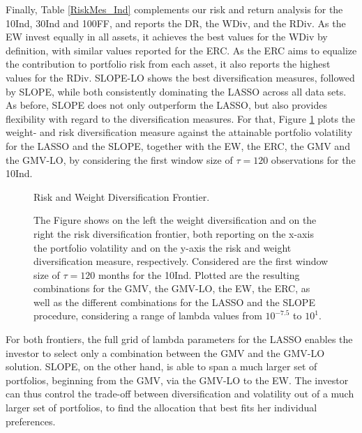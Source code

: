 \documentclass[12pt, a4paper]{article}
\begin{document}
%
\noindent
Finally, Table \ref{RiskMes_Ind} complements our risk and return analysis for the 10Ind, 30Ind and 100FF, and reports the DR, the WDiv, and the RDiv. As the EW invest equally in all assets, it achieves the best values for the WDiv by definition, with similar values reported for the ERC. As the ERC aims to equalize the contribution to portfolio risk from each asset, it also reports the highest values for the RDiv. SLOPE-LO shows the best diversification measures, followed by SLOPE, while both consistently dominating the LASSO across all data sets. \\
As before, SLOPE does not only outperform the LASSO, but also provides flexibility with regard to the diversification measures. For that, Figure \ref{Frontier_Ind} plots the weight- and risk diversification measure against the attainable portfolio volatility for the LASSO and the SLOPE, together with the EW, the ERC, the GMV and the GMV-LO, by considering the first window size of $\tau=120$ observations for the 10Ind.
%
\begin{figure}[h!]
\centering
\caption{Risk and Weight Diversification Frontier.}\label{Frontier_Ind}
\captionsetup{font=scriptsize,labelfont=scriptsize, width=\textwidth}
\caption*{The Figure shows on the left the weight diversification and on the right the risk diversification frontier, both reporting on the x-axis the portfolio volatility and on the y-axis the risk and weight diversification measure, respectively. Considered are the first window size of $\tau =120$ months for the 10Ind. Plotted are the resulting combinations for the GMV, the GMV-LO, the EW, the ERC, as well as the different combinations for the LASSO and the SLOPE procedure, considering a range of lambda values from $10^{-7.5}$ to $10^{1}$.}
\end{figure}
%
For both frontiers, the full grid of lambda parameters for the LASSO enables the investor to select only a combination between the GMV and the GMV-LO solution. SLOPE, on the other hand, is able to span a much larger set of portfolios, beginning from the GMV, via the GMV-LO to the EW. The investor can thus control the trade-off between diversification and volatility out of a much larger set of portfolios, to find the allocation that best fits her individual preferences.
\end{document}
